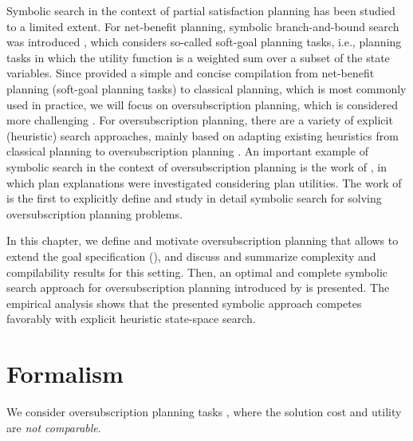 Symbolic search in the context of partial satisfaction planning has been studied to a limited extent.
For net-benefit planning, symbolic branch-and-bound search was introduced \autocite{edelkamp-kissmann-ijcai2009,kissmann-phd2012}, which considers so-called soft-goal planning tasks, i.e., planning tasks in which the utility function is a weighted sum over a subset of the state variables. 
Since \textcite{keyder-geffner-jair2009} provided a simple and concise compilation from net-benefit planning (soft-goal planning tasks) to classical planning, which is most commonly used in practice, we will focus on oversubscription planning, which is considered more challenging \autocite{domshlak-mirkis-jair2015}.
%
For oversubscription planning, there are a variety of explicit (heuristic) search approaches, mainly based on adapting existing heuristics from classical planning to oversubscription planning \autocite{mirkis-domshlak-icaps2013,domshlak-mirkis-jair2015,muller-karpas-icaps2018,katz-et-al-icaps2019,katz-et-al-icaps2019,garcia-olaya-et-al-aij2021}.
An important example of symbolic search in the context of oversubscription planning is the work of \textcite{eifler-et-al-ijcai2020}, in which plan explanations were investigated considering plan utilities.
The work of \textcite{speck-katz-aaai2021} is the first to explicitly define and study in detail symbolic search for solving oversubscription planning problems.

In this chapter, we define and motivate oversubscription planning that allows to extend the goal specification (), and discuss and summarize complexity and compilability results for this setting.
Then, an optimal and complete symbolic search approach for oversubscription planning introduced by \textcite{speck-katz-aaai2021} is presented.
The empirical analysis shows that the presented symbolic approach competes favorably with explicit heuristic state-space search.

\section{Formalism}

We consider oversubscription planning tasks \autocite{smith-icaps2004,katz-et-al-icaps2019}, where the solution cost and utility are \emph{not comparable}.

